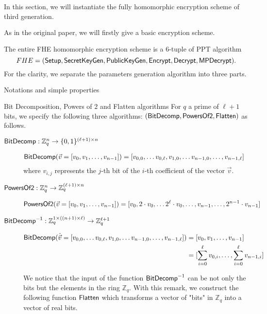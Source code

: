 
In this section, we will instantiate the fully homomorphic encryption scheme of third generation\cite{DBLP:conf/crypto/GentrySW13}.

As in the original paper, we will firstly give a basic encryption scheme.

The entire FHE homomorphic encryption scheme is a $6$-tuple of PPT algorithm 
$$FHE = ({\mathsf{Setup}}, {\mathsf{SecretKeyGen}}, {\mathsf{PublicKeyGen}}, {\mathsf{Encrypt}}, {\mathsf{Decrypt}}, {\mathsf{MPDecrypt}}).$$ 
For the clarity, we separate the parameters generation algorithm into three parts.


\begin{section}{Notations and simple properties}
  \begin{definition}{Bit Decomposition, Powers of $2$ and Flatten algorithms}
    For $q$ a prime of $\ell+1$ bits, we specify the following three algorithms: $({\mathsf{BitDecomp}}, {\mathsf{PowersOf2}}, {\mathsf{Flatten}})$ as follows.
    \begin{description}
    \item[${\mathsf{{\mathsf{BitDecomp}}}}: \mathbb{Z}_q^{n} \to \{0,1\}^{(\ell+1) \times n}$]
      \begin{align*}
        {\mathsf{BitDecomp}}(\vec{v} = [v_0, v_1, \dots, v_{n-1}]) &= [v_{0,0}, \dots v_{0,\ell}, v_{1,0}, \dots v_{n-1,0}, \dots, v_{n-1, \ell}]
      \end{align*}
      where $v_{i,j}$ represents the $j$-th bit of the $i$-th coefficient of the vector $\vec{v}$.

    \item[${\mathsf{{\mathsf{PowersOf2}}}}: \mathbb{Z}_q^{n} \to \mathbb{Z}_q^{(\ell+1) \times n}$]
      \begin{align*}
        {\mathsf{PowersOf2}}(\vec{v} = [v_0, v_1, \dots, v_{n-1}]) &= [v_0, 2 \cdot v_0, \dots 2^{\ell} \cdot v_0, \dots, v_{n-1}, \dots, 2^{n-1} \cdot v_{n-1}]
      \end{align*}

    \item[${\mathsf{{\mathsf{BitDecomp}}^{-1}}}: \mathbb{Z}_q^{1 \times ((n + 1) \times \ell)} \to \mathbb{Z}_q^{\ell+1}$]
      \begin{align*}
        {\mathsf{BitDecomp}}(\hat{\vec{v}} = [v_{0,0}, \dots v_{0,\ell}, v_{1,0}, \dots v_{n-1,0}, \dots, v_{n-1, \ell}]) &= [v_0, v_1, \dots, v_{n-1}]\\
                                                                                                               &=[\sum_{i = 0}^{\ell} v_{0,i}, \dots, \sum_{i=0}^{\ell} v_{n-1, i}]
      \end{align*}

      We notice that the input of the function ${\mathsf{{\mathsf{BitDecomp}}}^{-1}}$ can be not only the bits but the elements in the ring $\mathbb{Z}_q$. With this remark, we construct the following function ${\mathsf{Flatten}}$ which transforms a vector of "bits" in $\mathbb{Z}_q$ into a vector of real bits.


\end{description}
\end{definition}
\end{section}
